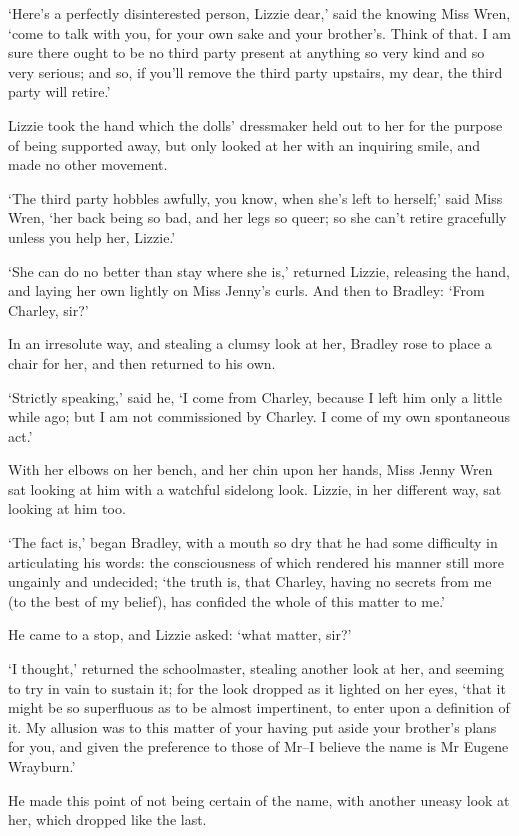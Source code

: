 ‘Here’s a perfectly disinterested person, Lizzie dear,’ said the knowing
Miss Wren, ‘come to talk with you, for your own sake and your brother’s.
Think of that. I am sure there ought to be no third party present at
anything so very kind and so very serious; and so, if you’ll remove the
third party upstairs, my dear, the third party will retire.’

Lizzie took the hand which the dolls’ dressmaker held out to her for
the purpose of being supported away, but only looked at her with an
inquiring smile, and made no other movement.

‘The third party hobbles awfully, you know, when she’s left to herself;’
said Miss Wren, ‘her back being so bad, and her legs so queer; so she
can’t retire gracefully unless you help her, Lizzie.’

‘She can do no better than stay where she is,’ returned Lizzie,
releasing the hand, and laying her own lightly on Miss Jenny’s curls.
And then to Bradley: ‘From Charley, sir?’

In an irresolute way, and stealing a clumsy look at her, Bradley rose to
place a chair for her, and then returned to his own.

‘Strictly speaking,’ said he, ‘I come from Charley, because I left him
only a little while ago; but I am not commissioned by Charley. I come of
my own spontaneous act.’

With her elbows on her bench, and her chin upon her hands, Miss Jenny
Wren sat looking at him with a watchful sidelong look. Lizzie, in her
different way, sat looking at him too.

‘The fact is,’ began Bradley, with a mouth so dry that he had some
difficulty in articulating his words: the consciousness of which
rendered his manner still more ungainly and undecided; ‘the truth is,
that Charley, having no secrets from me (to the best of my belief), has
confided the whole of this matter to me.’

He came to a stop, and Lizzie asked: ‘what matter, sir?’

‘I thought,’ returned the schoolmaster, stealing another look at her,
and seeming to try in vain to sustain it; for the look dropped as it
lighted on her eyes, ‘that it might be so superfluous as to be almost
impertinent, to enter upon a definition of it. My allusion was to this
matter of your having put aside your brother’s plans for you, and
given the preference to those of Mr--I believe the name is Mr Eugene
Wrayburn.’

He made this point of not being certain of the name, with another uneasy
look at her, which dropped like the last.

